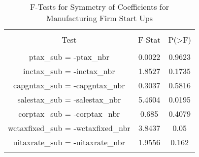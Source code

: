 
\begin{table}[!htbp] \centering 
  \caption{F-Tests for Symmetry of Coefficients for Manufacturing Firm Start Ups} 
  \label{31-33Ftests} 
\begin{tabular}{@{\extracolsep{5pt}} ccc} 
\\[-1.8ex]\hline 
\hline \\[-1.8ex] 
Test & F-Stat & P(\textgreater F) \\ 
\hline \\[-1.8ex] 
ptax\_sub = -ptax\_nbr & 0.0022 & 0.9623 \\ 
inctax\_sub = -inctax\_nbr & 1.8527 & 0.1735 \\ 
capgntax\_sub = -capgntax\_nbr & 0.3037 & 0.5816 \\ 
salestax\_sub = -salestax\_nbr & 5.4604 & 0.0195 \\ 
corptax\_sub = -corptax\_nbr & 0.685 & 0.4079 \\ 
wctaxfixed\_sub = -wctaxfixed\_nbr & 3.8437 & 0.05 \\ 
uitaxrate\_sub = -uitaxrate\_nbr & 1.9556 & 0.162 \\ 
\hline \\[-1.8ex] 
\end{tabular} 
\end{table} 
